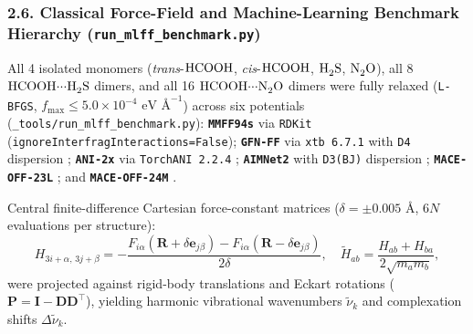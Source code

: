 \documentclass[journal=jpclcd,manuscript=article]{achemso}
\begin{document}
\subsubsection{2.6. Classical Force-Field and Machine-Learning Benchmark Hierarchy (\texttt{run\_mlff\_benchmark.py})}
All 4 isolated monomers (\textit{trans}-$\ce{HCOOH}$, \textit{cis}-$\ce{HCOOH}$, $\ce{H2S}$, $\ce{N2O}$), all 8 $\ce{HCOOH\bond{...}H2S}$ dimers, and all 16 $\ce{HCOOH\bond{...}N2O}$ dimers were fully relaxed (\texttt{L-BFGS}, $f_{\max} \le 5.0\times 10^{-4}\text{ eV \AA}^{-1}$) across six potentials (\texttt{\_tools/run\_mlff\_benchmark.py}): \textbf{\texttt{MMFF94s}} \cite{Halgren1996, Halgren1999} via \texttt{RDKit} \cite{Landrum2024} (\texttt{ignoreInterfragInteractions=False}); \textbf{\texttt{GFN-FF}} \cite{Spicher2020} via \texttt{xtb 6.7.1} with \texttt{D4} dispersion \cite{Caldeweyher2019}; \textbf{\texttt{ANI-2x}} \cite{Devereux2020, Smith2017, Behler2007} via \texttt{TorchANI 2.2.4} \cite{Gao2020}; \textbf{\texttt{AIMNet2}} \cite{Anstine2025} with \texttt{D3(BJ)} dispersion \cite{Grimme2010, Grimme2011}; \textbf{\texttt{MACE-OFF-23L}} \cite{Kovacs2025, Batatia2022}; and \textbf{\texttt{MACE-OFF-24M}} \cite{Kovacs2025, Batatia2022}.

Central finite-difference Cartesian force-constant matrices ($\delta = \pm 0.005\text{ \AA}$, $6N$ evaluations per structure):
\begin{equation}
  H_{3i+\alpha,\,3j+\beta} = -\frac{F_{i\alpha}(\mathbf{R} + \delta\mathbf{e}_{j\beta}) - F_{i\alpha}(\mathbf{R} - \delta\mathbf{e}_{j\beta})}{2\delta}, \quad \tilde{H}_{ab} = \frac{H_{ab} + H_{ba}}{2\sqrt{m_a m_b}},
\end{equation}
were projected against rigid-body translations and Eckart rotations ($\mathbf{P} = \mathbf{I} - \mathbf{D}\mathbf{D}^\top$), yielding harmonic vibrational wavenumbers $\tilde{\nu}_k$ and complexation shifts $\Delta\tilde{\nu}_k$.
\end{document}
